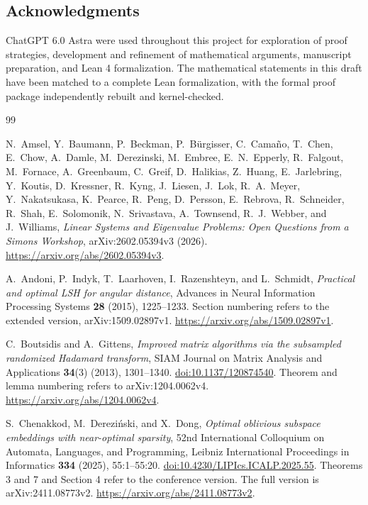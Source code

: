 \documentclass[11pt]{article}
\theoremstyle{definition}
\theoremstyle{remark}
\theoremstyle{plain}
\begin{document}
\begin{small}
  \section*{Acknowledgments} ChatGPT 6.0 Astra  were used     throughout this project for exploration of proof strategies, development and refinement of mathematical arguments, manuscript preparation, and Lean 4 formalization. The mathematical statements in this draft have been matched to a complete Lean formalization, with the formal proof package independently rebuilt and kernel-checked.

\end{small}

\begin{thebibliography}{99}

N.~Amsel, Y.~Baumann, P.~Beckman, P.~B\"urgisser, C.~Cama\~no,
T.~Chen, E.~Chow, A.~Damle, M.~Derezinski, M.~Embree,
E.~N.~Epperly, R.~Falgout, M.~Fornace, A.~Greenbaum, C.~Greif,
D.~Halikias, Z.~Huang, E.~Jarlebring, Y.~Koutis, D.~Kressner,
R.~Kyng, J.~Liesen, J.~Lok, R.~A.~Meyer, Y.~Nakatsukasa,
K.~Pearce, R.~Peng, D.~Persson, E.~Rebrova, R.~Schneider,
R.~Shah, E.~Solomonik, N.~Srivastava, A.~Townsend, R.~J.~Webber,
and J.~Williams,
\emph{Linear Systems and Eigenvalue Problems: Open Questions from
a Simons Workshop}, arXiv:2602.05394v3 (2026).
\url{https://arxiv.org/abs/2602.05394v3}.

A.~Andoni, P.~Indyk, T.~Laarhoven, I.~Razenshteyn, and L.~Schmidt,
\emph{Practical and optimal LSH for angular distance},
Advances in Neural Information Processing Systems \textbf{28}
(2015), 1225--1233.
Section numbering refers to the extended version, arXiv:1509.02897v1.
\url{https://arxiv.org/abs/1509.02897v1}.

C.~Boutsidis and A.~Gittens,
\emph{Improved matrix algorithms via the subsampled randomized
Hadamard transform},
SIAM Journal on Matrix Analysis and Applications \textbf{34}(3)
(2013), 1301--1340.
\href{https://doi.org/10.1137/120874540}{doi:10.1137/120874540}.
Theorem and lemma numbering refers to arXiv:1204.0062v4.
\url{https://arxiv.org/abs/1204.0062v4}.

S.~Chenakkod, M.~Derezi\'nski, and X.~Dong,
\emph{Optimal oblivious subspace embeddings with near-optimal sparsity},
52nd International Colloquium on Automata, Languages, and Programming,
Leibniz International Proceedings in Informatics \textbf{334}
(2025), 55:1--55:20.
\href{https://doi.org/10.4230/LIPIcs.ICALP.2025.55}{doi:10.4230/LIPIcs.ICALP.2025.55}.
Theorems 3 and 7 and Section 4 refer to the conference version.
The full version is arXiv:2411.08773v2.
\url{https://arxiv.org/abs/2411.08773v2}.


\end{thebibliography}
\end{document}
